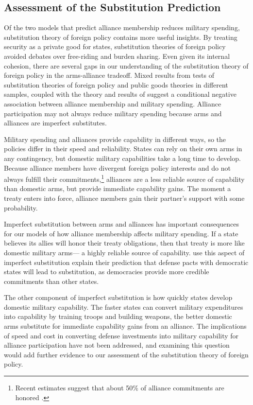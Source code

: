 \documentclass[12pt]{article}
\begin{document}
\subsection{Assessment of the Substitution Prediction}


Of the two models that predict alliance membership reduces military spending, substitution theory of foreign policy contains more useful insights. 
By treating security as a private good for states, substitution theories of foreign policy avoided debates over free-riding and burden sharing. 
Even given its internal cohesion, there are several gaps in our understanding of the substitution theory of foreign policy in the arms-alliance tradeoff. 
Mixed results from tests of substitution theories of foreign policy and public goods theories in different samples, coupled with the theory and results of \citet{DigiuseppePoast2016} suggest a conditional negative association between alliance membership and military spending. 
Alliance participation may not always reduce military spending because arms and alliances are imperfect substitutes. 


Military spending and alliances provide capability in different ways, so the policies differ in their speed and reliability.
States can rely on their own arms in any contingency, but domestic military capabilities take a long time to develop. 
Because alliance members have divergent foreign policy interests and do not always fulfill their commitments,\footnote{Recent estimates suggest that about 50\% of alliance commitments are honored \citep{BerkemeierFuhrmann2018}.} alliances are a less reliable source of capability than domestic arms, but provide immediate capability gains. 
The moment a treaty enters into force, alliance members gain their partner’s support with some probability.


Imperfect substitution between arms and alliances has important consequences for our models of how alliance membership affects military spending. 
If a state believes its allies will honor their treaty obligations, then that treaty is more like domestic military arms--- a highly reliable source of capability.
\citet{DigiuseppePoast2016} use this aspect of imperfect substitution explain their prediction that defense pacts with democratic states will lead to substitution, as democracies provide more credible commitments than other states.


The other component of imperfect substitution is how quickly states develop domestic military capability.  
The faster states can convert military expenditures into capability by training troops and building weapons, the better domestic arms substitute for immediate capability gains from an alliance. 
The implications of speed and cost in converting defense investments into military capability for alliance participation have not been addressed, and examining this question would add further evidence to our assessment of the substitution theory of foreign policy. 
\end{document}
